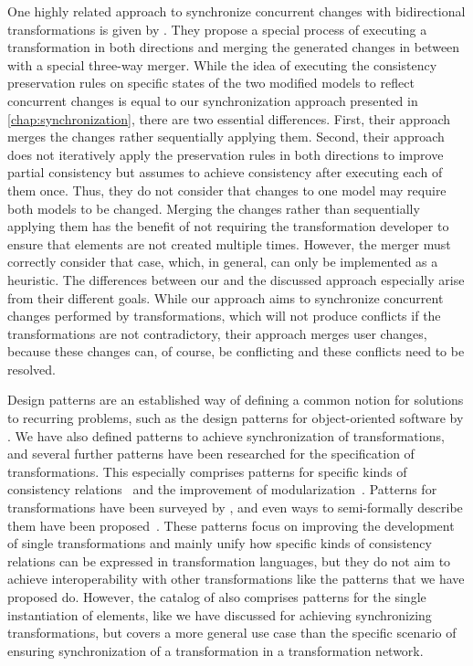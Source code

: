 One highly related approach to synchronize concurrent changes with bidirectional transformations is given by \textcite{xiong2009parallelUpdates-ICMT,xiong2013SynchronizingConcurrentUpdates-SoSym}.
They propose a special process of executing a transformation in both directions and merging the generated changes in between with a special three-way merger.
While the idea of executing the consistency preservation rules on specific states of the two modified models to reflect concurrent changes is equal to our synchronization approach presented in \autoref{chap:synchronization}, there are two essential differences.
First, their approach merges the changes rather sequentially applying them.
Second, their approach does not iteratively apply the preservation rules in both directions to improve partial consistency but assumes to achieve consistency after executing each of them once. Thus, they do not consider that changes to one model may require both models to be changed.
Merging the changes rather than sequentially applying them has the benefit of not requiring the transformation developer to ensure that elements are not created multiple times. However, the merger must correctly consider that case, which, in general, can only be implemented as a heuristic.
The differences between our and the discussed approach especially arise from their different goals. 
While our approach aims to synchronize concurrent changes performed by transformations, which will not produce conflicts if the transformations are not contradictory, their approach merges user changes, because these changes can, of course, be conflicting and these conflicts need to be resolved.

Design patterns are an established way of defining a common notion for solutions to recurring problems, such as the design patterns for object-oriented software by \textcite{gamma1995designPatterns-Book}.
We have also defined patterns to achieve synchronization of transformations, and several further patterns have been researched for the specification of transformations.
This especially comprises patterns for specific kinds of consistency relations~\cite{iacob2008a} and the improvement of modularization~\cite{lano2014a}.
Patterns for transformations have been surveyed by \textcite{lano2018a}, and even ways to semi-formally describe them have been proposed~\cite{ergin2016patternsTransformations-CLSS}.
These patterns focus on improving the development of single transformations and mainly unify how specific kinds of consistency relations can be expressed in transformation languages, but they do not aim to achieve interoperability with other transformations like the patterns that we have proposed do.
However, the catalog of \textcite{lano2014a} also comprises patterns for the single instantiation of elements, like we have discussed for achieving synchronizing transformations, but covers a more general use case than the specific scenario of ensuring synchronization of a transformation in a transformation network.



